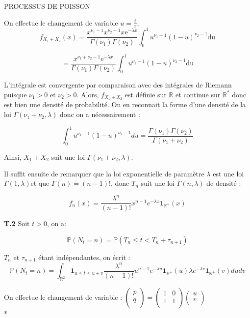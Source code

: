 PROCESSUS DE POISSON\documentclass[a4paper,10pt]{article}
\begin{document}
On effectue le changement de variable $ u=\frac{t}{x}$,
$$
f_{X_{1}+X_{2}}(x)=\frac{x^{\nu_{1}-1}x^{\nu_{2}-1}x\mathrm{e}^{-{\lambda}x}}{\Gamma(\nu_{1})\Gamma(\nu_{2})}\int_{0}^{1}{u^{\nu_{1}-1}(1-u)^{\nu_{2}-1}}\mathrm{du}
$$

$$
=\frac{x^{\nu_{1}+\nu_{2}-1}\mathrm{e}^{-{\lambda}x}}{\Gamma(\nu_{1})\Gamma(\nu_{2})}\int_{0}^{1}{u^{\nu_{1}-1}(1-u)^{\nu_{2}-1}}\mathrm{du}
$$

L'int\'{e}grale est convergente par comparaison avec des int\'{e}grales de Riemann puisque $\nu_1>0$ et $\nu_2>0$. Alors, $f_{X_1+X_2}$ est d\'{e}finie sur $\mathbb{R}$ et continue sur $\mathbb{R}^*$ donc est bien une densit\'{e} de probabilit\'{e}. On en reconnait la forme d'une densit\'{e} de la loi $\Gamma(\nu_1+\nu_2,\lambda)$ donc on a n\'{e}cessairement :

$$
\int_{0}^{1}{u^{\nu_{1}-1}(1-u)^{\nu_{2}-1}}du=\frac{\Gamma(\nu_{1})\Gamma(\nu_{2})}{\Gamma(\nu_{1}+\nu_{2})}$$

Ainsi, $X_{1}+X_{2}$ suit une loi $\Gamma(\nu_{1}+\nu_{2},\lambda)$.

 Il suffit ensuite de remarquer que  la loi exponentielle de param\`{e}tre $\lambda$ est une loi $\Gamma(1,\lambda)$et que $ \Gamma(n)=(n-1)!$, donc $T_n$ suit une loi $\Gamma(n,\lambda)$ de densit\'{e} :

$$
f_n(x)=\frac{{\lambda}^n}{(n-1)!}{x^{n-1}}{e^{-{\lambda}x}\textbf{1}_{\mathbb{R}^+}}(x)
$$

\textbf{T.2} Soit $t>0$, on a:

$$
\mathbb{P}(N_t=n)=\mathbb{P}(T_n\leqslant t<T_n+{\tau}_{n+1})
$$

$T_n$ et $ \tau_{n+1}$ étant indépendantes, on écrit :
$$
\mathbb{P}(N_t=n)=\int_{\mathbb{R}^2}{\textbf{1}_{u \leqslant t \leqslant u+v}}\frac{{\lambda}^n}{(n-1)!}{u^{n-1}}{e^{-{\lambda}u}\textbf{1}_{\mathbb{R}^+}}(u){\lambda}e^{-{\lambda}v}\textbf{1}_{\mathbb{R}^+}(v)dudv
$$

On effectue le changement de variable : $\begin{pmatrix} p \\q \\ \end{pmatrix}=\begin{pmatrix} 1 & 0 \\1 & 1 \\ \end{pmatrix}\begin{pmatrix} u \\v \\ \end{pmatrix}$\\*
\end{document}
